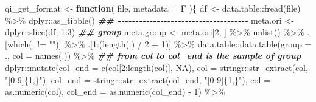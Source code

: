 \documentclass[
]{article}
\newenvironment{Shaded}{\begin{snugshade}}{\end{snugshade}}
\newcommand{\AttributeTok}[1]{\textcolor[rgb]{0.77,0.63,0.00}{#1}}
\newcommand{\ConstantTok}[1]{\textcolor[rgb]{0.00,0.00,0.00}{#1}}
\newcommand{\ControlFlowTok}[1]{\textcolor[rgb]{0.13,0.29,0.53}{\textbf{#1}}}
\newcommand{\DecValTok}[1]{\textcolor[rgb]{0.00,0.00,0.81}{#1}}
\newcommand{\DocumentationTok}[1]{\textcolor[rgb]{0.56,0.35,0.01}{\textbf{\textit{#1}}}}
\newcommand{\FunctionTok}[1]{\textcolor[rgb]{0.00,0.00,0.00}{#1}}
\newcommand{\NormalTok}[1]{#1}
\newcommand{\OtherTok}[1]{\textcolor[rgb]{0.56,0.35,0.01}{#1}}
\newcommand{\SpecialCharTok}[1]{\textcolor[rgb]{0.00,0.00,0.00}{#1}}
\newcommand{\StringTok}[1]{\textcolor[rgb]{0.31,0.60,0.02}{#1}}
\begin{document}
\begin{Shaded}
\begin{Highlighting}[]
\NormalTok{qi\_get\_format }\OtherTok{\textless{}{-}} 
  \ControlFlowTok{function}\NormalTok{(}
\NormalTok{           file,}
           \AttributeTok{metadata =}\NormalTok{ F}
\NormalTok{           )\{}
\NormalTok{    df }\OtherTok{\textless{}{-}}\NormalTok{ data.table}\SpecialCharTok{::}\FunctionTok{fread}\NormalTok{(file) }\SpecialCharTok{\%\textgreater{}\%} 
\NormalTok{      dplyr}\SpecialCharTok{::}\FunctionTok{as\_tibble}\NormalTok{()}
    \DocumentationTok{\#\# {-}{-}{-}{-}{-}{-}{-}{-}{-}{-}{-}{-}{-}{-}{-}{-}{-}{-}{-}{-}{-}{-}{-}{-}{-}{-}{-}{-}{-}{-}{-}{-}{-}{-}{-}{-}{-} }
\NormalTok{    meta.ori }\OtherTok{\textless{}{-}}\NormalTok{ dplyr}\SpecialCharTok{::}\FunctionTok{slice}\NormalTok{(df, }\DecValTok{1}\SpecialCharTok{:}\DecValTok{3}\NormalTok{)}
    \DocumentationTok{\#\# group}
\NormalTok{    meta.group }\OtherTok{\textless{}{-}}\NormalTok{ meta.ori[}\DecValTok{2}\NormalTok{, ] }\SpecialCharTok{\%\textgreater{}\%} 
      \FunctionTok{unlist}\NormalTok{() }\SpecialCharTok{\%\textgreater{}\%} 
\NormalTok{      .[}\FunctionTok{which}\NormalTok{(. }\SpecialCharTok{!=} \StringTok{""}\NormalTok{)] }\SpecialCharTok{\%\textgreater{}\%} 
\NormalTok{      .[}\DecValTok{1}\SpecialCharTok{:}\NormalTok{(}\FunctionTok{length}\NormalTok{(.) }\SpecialCharTok{/} \DecValTok{2} \SpecialCharTok{+} \DecValTok{1}\NormalTok{)] }\SpecialCharTok{\%\textgreater{}\%} 
\NormalTok{      data.table}\SpecialCharTok{::}\FunctionTok{data.table}\NormalTok{(}\AttributeTok{group =}\NormalTok{ ., }\AttributeTok{col =} \FunctionTok{names}\NormalTok{(.)) }\SpecialCharTok{\%\textgreater{}\%} 
      \DocumentationTok{\#\# from col to col\_end is the sample of group}
\NormalTok{      dplyr}\SpecialCharTok{::}\FunctionTok{mutate}\NormalTok{(}\AttributeTok{col\_end =} \FunctionTok{c}\NormalTok{(col[}\DecValTok{2}\SpecialCharTok{:}\FunctionTok{length}\NormalTok{(col)], }\ConstantTok{NA}\NormalTok{),}
                    \AttributeTok{col =}\NormalTok{ stringr}\SpecialCharTok{::}\FunctionTok{str\_extract}\NormalTok{(col, }\StringTok{"[0{-}9]\{1,\}"}\NormalTok{),}
                    \AttributeTok{col\_end =}\NormalTok{ stringr}\SpecialCharTok{::}\FunctionTok{str\_extract}\NormalTok{(col\_end, }\StringTok{"[0{-}9]\{1,\}"}\NormalTok{),}
                    \AttributeTok{col =} \FunctionTok{as.numeric}\NormalTok{(col),}
                    \AttributeTok{col\_end =} \FunctionTok{as.numeric}\NormalTok{(col\_end) }\SpecialCharTok{{-}} \DecValTok{1}\NormalTok{) }\SpecialCharTok{\%\textgreater{}\%} 

\end{Highlighting}
\end{Shaded}
\end{document}
